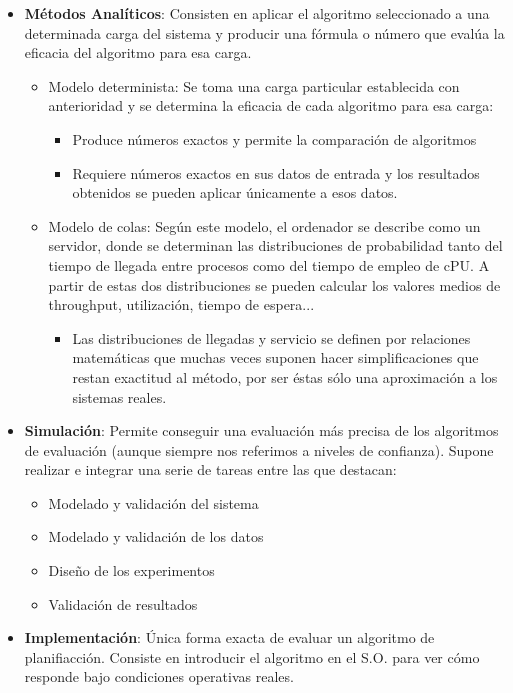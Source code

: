 \documentclass[10pt,portrait, twocolumn]{article}
\begin{document}
	\begin{itemize}
	\item \textbf{Métodos Analíticos}: Consisten en aplicar el algoritmo seleccionado a una determinada carga del sistema y producir una fórmula o número que evalúa la eficacia del algoritmo para esa carga.
		\begin{itemize}
		\item Modelo determinista: Se toma una carga particular establecida con anterioridad y se determina la eficacia de cada algoritmo para esa carga:
			\begin{itemize}
			\item Produce números exactos y permite la comparación de algoritmos
			\item Requiere números exactos en sus datos de entrada y los resultados obtenidos se pueden aplicar únicamente a esos datos.
			\end{itemize}
		\item Modelo de colas: Según este modelo, el ordenador se describe como un servidor, donde se determinan las distribuciones de probabilidad tanto del tiempo de llegada entre procesos como del tiempo de empleo de cPU. A partir de estas dos distribuciones se pueden calcular los valores medios de throughput, utilización, tiempo de espera...
			\begin{itemize}
			\item Las distribuciones de llegadas y servicio se definen por relaciones matemáticas que muchas veces suponen hacer simplificaciones que restan exactitud al método, por ser éstas sólo una aproximación a los sistemas reales.
			\end{itemize}
		\end{itemize}
	\item \textbf{Simulación}: Permite conseguir una evaluación más precisa de los algoritmos de evaluación (aunque siempre nos referimos a niveles de confianza). Supone realizar e integrar una serie de tareas entre las que destacan:
		\begin{itemize}
		\item Modelado y validación del sistema
		\item Modelado y validación de los datos
		\item Diseño de los experimentos
		\item Validación de resultados
		\end{itemize}
	\item \textbf{Implementación}: Única forma exacta de evaluar un algoritmo de planifiacción. Consiste en introducir el algoritmo en el S.O. para ver cómo responde bajo condiciones operativas reales.\\
	\end{itemize}
	
\end{document}
